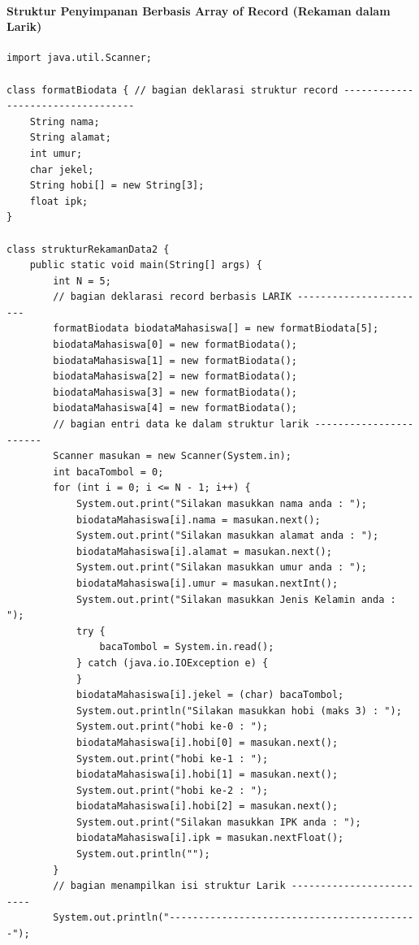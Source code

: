 \documentclass[a4paper,12pt]{article}
\begin{document}
\paragraph*{Struktur Penyimpanan Berbasis Array of Record (Rekaman dalam Larik)\\}
\begin{lstlisting}
import java.util.Scanner;

class formatBiodata { // bagian deklarasi struktur record ----------------------------------
    String nama;
    String alamat;
    int umur;
    char jekel;
    String hobi[] = new String[3];
    float ipk;
}

class strukturRekamanData2 {
    public static void main(String[] args) {
        int N = 5;
        // bagian deklarasi record berbasis LARIK -----------------------
        formatBiodata biodataMahasiswa[] = new formatBiodata[5];
        biodataMahasiswa[0] = new formatBiodata();
        biodataMahasiswa[1] = new formatBiodata();
        biodataMahasiswa[2] = new formatBiodata();
        biodataMahasiswa[3] = new formatBiodata();
        biodataMahasiswa[4] = new formatBiodata();
        // bagian entri data ke dalam struktur larik -----------------------
        Scanner masukan = new Scanner(System.in);
        int bacaTombol = 0;
        for (int i = 0; i <= N - 1; i++) {
            System.out.print("Silakan masukkan nama anda : ");
            biodataMahasiswa[i].nama = masukan.next();
            System.out.print("Silakan masukkan alamat anda : ");
            biodataMahasiswa[i].alamat = masukan.next();
            System.out.print("Silakan masukkan umur anda : ");
            biodataMahasiswa[i].umur = masukan.nextInt();
            System.out.print("Silakan masukkan Jenis Kelamin anda : ");
            try {
                bacaTombol = System.in.read();
            } catch (java.io.IOException e) {
            }
            biodataMahasiswa[i].jekel = (char) bacaTombol;
            System.out.println("Silakan masukkan hobi (maks 3) : ");
            System.out.print("hobi ke-0 : ");
            biodataMahasiswa[i].hobi[0] = masukan.next();
            System.out.print("hobi ke-1 : ");
            biodataMahasiswa[i].hobi[1] = masukan.next();
            System.out.print("hobi ke-2 : ");
            biodataMahasiswa[i].hobi[2] = masukan.next();
            System.out.print("Silakan masukkan IPK anda : ");
            biodataMahasiswa[i].ipk = masukan.nextFloat();
            System.out.println("");
        }
        // bagian menampilkan isi struktur Larik -------------------------
        System.out.println("-------------------------------------------");

\end{lstlisting}
\end{document}
